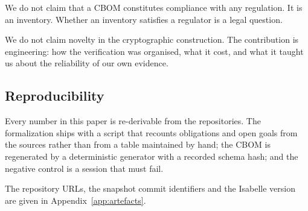 We do not claim that a CBOM constitutes compliance with any regulation. It is an
inventory. Whether an inventory satisfies a regulator is a legal question.

We do not claim novelty in the cryptographic construction. The contribution is
engineering: how the verification was organised, what it cost, and what it
taught us about the reliability of our own evidence.

\subsection{Reproducibility}

Every number in this paper is re-derivable from the repositories. The
formalization ships with a script that recounts obligations and open goals from
the sources rather than from a table maintained by hand; the CBOM is regenerated
by a deterministic generator with a recorded schema hash; and the negative
control is a session that must fail.

The repository URLs, the snapshot commit identifiers and the Isabelle version
are given in Appendix~\ref{app:artefacts}.
